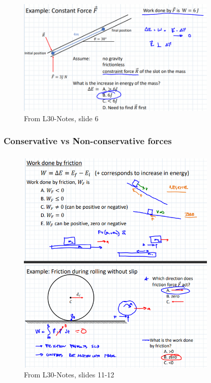     \noindent {}
    \begin{figure}[h!]
    \centering \includegraphics[width=0.85\textwidth]{WorkEnergyFigs/WorkExample.png}
    \caption{From L30-Notes, slide 6}
    \label{fig:WorkExample}
\end{figure}

    \subsubsection{Conservative vs Non-conservative forces}

    \subsubsection{}
    \begin{figure}[h!]
    \centering \includegraphics[width=0.85\textwidth]{WorkEnergyFigs/WorkFriction.png}
    \caption{From L30-Notes, slides 11-12}
    \label{fig:WorkFriction}
    \end{figure}
    

